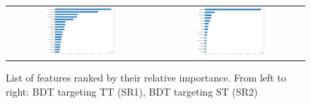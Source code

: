 \begin{figure}[tbh!]
 \begin{center}
 \begin{tabular}{cc}
  \includegraphics[width=0.48\textwidth]{figures/Part3/BDT/TTranking}&
  \includegraphics[width=0.48\textwidth]{figures/Part3/BDT/STranking}\\
 \end{tabular}
 \caption{List of features ranked by their relative importance. From left to right: BDT targeting TT (SR1), BDT targeting ST (SR2)}
 \label{fig:Ranking}
 \end{center}
\end{figure}

